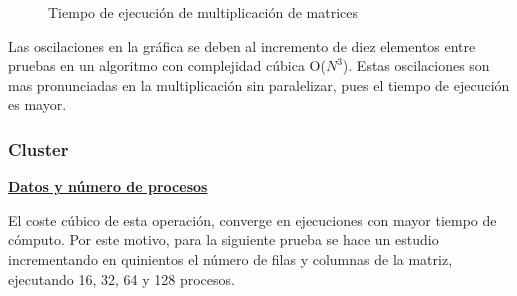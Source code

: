 		\begin{figure}[!h]
		\centering
		\caption{Tiempo de ejecución de multiplicación de matrices}
		\label{fig:matrices}
		\end{figure}
		
		\newpage
		
		Las oscilaciones en la gráfica se deben al incremento de diez elementos entre pruebas en un algoritmo con complejidad cúbica O($N^{3}$). Estas oscilaciones son mas pronunciadas en la multiplicación sin paralelizar, pues el tiempo de ejecución es mayor.
		
		\subsubsection{Cluster}
		
			\begin{flushleft}
			\begin{mdframed}[roundcorner=5pt]			
				\textbf{\underline{Datos y número de procesos}}
				\vspace{0.1cm}
				
				\scriptsize	
				El coste cúbico de esta operación, converge en ejecuciones con mayor tiempo de cómputo. Por este motivo, para la siguiente prueba se hace un estudio incrementando en quinientos el número de filas y columnas de la matriz, ejecutando 16, 32, 64 y 128 procesos.				
			\end{mdframed}
			\end{flushleft}	


